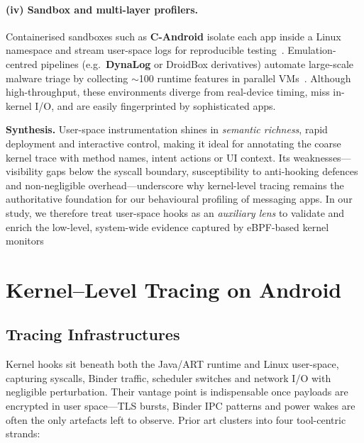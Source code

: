 \documentclass[a4paper,12pt]{report}
\begin{document}
\paragraph{(iv) Sandbox and multi-layer profilers.}
Containerised sandboxes such as \textbf{C-Android} isolate each app inside a
Linux namespace and stream user-space logs for reproducible
testing~\cite{candroid2019}.  Emulation-centred pipelines (e.g.\ \textbf{DynaLog}
or DroidBox derivatives) automate large-scale malware triage by collecting
$\sim$100 runtime features in parallel VMs~\cite{dynalog2016}.  Although
high-throughput, these environments diverge from real-device timing,
miss in-kernel I/O, and are easily fingerprinted by sophisticated apps.

\medskip
\noindent\textbf{Synthesis.}
User-space instrumentation shines in \emph{semantic richness}, rapid
deployment and interactive control, making it ideal for annotating the coarse
kernel trace with method names, intent actions or UI context.  Its
weaknesses—visibility gaps below the syscall boundary, susceptibility to
anti-hooking defences and non-negligible overhead—underscore why kernel-level
tracing remains the authoritative foundation for our behavioural profiling of
messaging apps.  In our study, we therefore treat user-space hooks as an
\emph{auxiliary lens} to validate and enrich the low-level, system-wide evidence
captured by eBPF-based kernel monitors



\section{Kernel–Level Tracing on Android}

\subsection{Tracing Infrastructures}
Kernel hooks sit beneath both the Java/ART runtime and Linux user-space, capturing syscalls, Binder traffic, scheduler switches and network I/O with negligible perturbation.  Their vantage point is indispensable once payloads are encrypted in user space—TLS bursts, Binder IPC patterns and power wakes are often the only artefacts left to observe.  Prior art clusters into four tool-centric strands:
\end{document}
